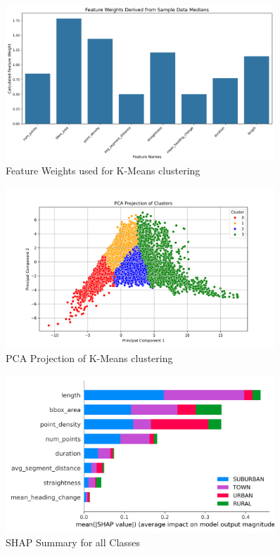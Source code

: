 \documentclass[a4paper,12pt,twoside]{scrreprt}
\begin{document}
\begin{figure}[htbp]
  \centering

  \includegraphics[width=0.9\textwidth]{Figures/feature_weights.png}
  \caption{Feature Weights used for K-Means clustering}
  \label{fig:feature_weights_for_kmeans}
\end{figure}

\begin{figure}[htbp]
  \centering

  \includegraphics[width=0.9\textwidth]{Figures/kmeans_diagram_feature_data.png}
  \caption{PCA Projection of K-Means clustering}
  \label{fig:pca_kmeans}
\end{figure}
\FloatBarrier

\begin{figure}[htbp]
  \centering

  \includegraphics[width=0.9\textwidth]{Figures/classifier/shap_summary_for_all_classes.png}
  \caption{SHAP Summary for all Classes}
  \label{fig:shap_all_classes}
\end{figure}
\end{document}
